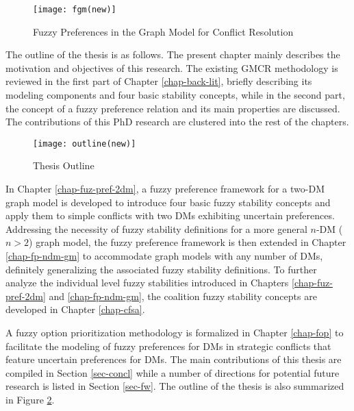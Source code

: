 \begin{figure}[!h]
\centering
\texttt{[image: fgm(new)]}
\caption{Fuzzy Preferences in the Graph Model for Conflict Resolution}
\label{fig-fgm}
\end{figure}

The outline of the thesis is as follows. The present chapter mainly describes the motivation and objectives of this research. The existing GMCR methodology is reviewed in the first part of Chapter \ref{chap-back-lit}, briefly describing its modeling components and four basic stability concepts, while in the second part, the concept of a fuzzy preference relation and its main properties are discussed. The contributions of this PhD research are clustered into the rest of the chapters.

\begin{figure}[!h]
\centering
\texttt{[image: outline(new)]}
\caption{Thesis Outline}
\label{outline}
\end{figure}

In Chapter \ref{chap-fuz-pref-2dm}, a fuzzy preference framework for a two-DM graph model is developed to introduce four basic fuzzy stability concepts and apply them to simple conflicts with two DMs exhibiting uncertain preferences. Addressing the necessity of fuzzy stability definitions for a more general $n$-DM ($n>2$) graph model, the fuzzy preference framework is then extended in Chapter \ref{chap-fp-ndm-gm} to accommodate graph models with any number of DMs, definitely generalizing the associated fuzzy stability definitions. To further analyze the individual level fuzzy stabilities introduced in Chapters \ref{chap-fuz-pref-2dm} and \ref{chap-fp-ndm-gm}, the coalition fuzzy stability concepts are developed in Chapter \ref{chap-cfsa}.

A fuzzy option prioritization methodology is formalized in Chapter \ref{chap-fop} to facilitate the modeling of fuzzy preferences for DMs in strategic conflicts that feature uncertain preferences for DMs. The main contributions of this thesis are compiled in Section \ref{sec-concl} while a number of directions for potential future research is listed in Section \ref{sec-fw}. The outline of the thesis is also summarized in Figure \ref{outline}.
